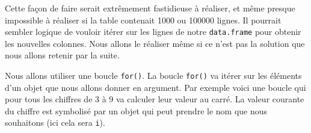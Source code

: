 \documentclass[
]{book}
\newenvironment{Shaded}{\begin{snugshade}}{\end{snugshade}}
\newcommand{\CommentTok}[1]{\textcolor[rgb]{0.56,0.35,0.01}{\textit{#1}}}
\newcommand{\ControlFlowTok}[1]{\textcolor[rgb]{0.13,0.29,0.53}{\textbf{#1}}}
\newcommand{\DecValTok}[1]{\textcolor[rgb]{0.00,0.00,0.81}{#1}}
\newcommand{\NormalTok}[1]{#1}
\newcommand{\OperatorTok}[1]{\textcolor[rgb]{0.81,0.36,0.00}{\textbf{#1}}}
\newcommand{\StringTok}[1]{\textcolor[rgb]{0.31,0.60,0.02}{#1}}
\begin{document}
\begin{Shaded}
\end{Shaded}

Cette façon de faire serait extrêmement fastidieuse à réaliser, et même presque impossible à réaliser si la table contenait 1000 ou 100000 lignes. Il pourrait sembler logique de vouloir itérer sur les lignes de notre \texttt{data.frame} pour obtenir les nouvelles colonnes. Nous allons le réaliser même si ce n'est pas la solution que nous allons retenir par la suite.

Nous allons utiliser une boucle \texttt{for()}. La boucle \texttt{for()} va itérer sur les éléments d'un objet que nous allons donner en argument. Par exemple voici une boucle qui pour tous les chiffres de 3 à 9 va calculer leur valeur au carré. La valeur courante du chiffre est symbolisé par un objet qui peut prendre le nom que nous souhaitons (ici cela sera \texttt{i}).
\end{document}
